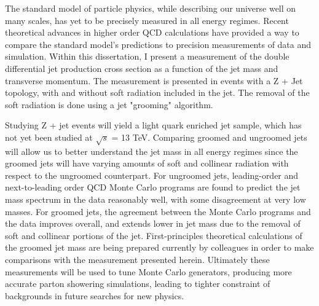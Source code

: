 
The standard model of particle physics, while describing our universe well on many scales, has yet to be precisely measured in all energy regimes. Recent theoretical advances in higher order QCD calculations have provided a way to compare the standard model's predictions to precision measurements of data and simulation. Within this dissertation, I present a measurement of the double differential jet production cross section as a function of the jet mass and transverse momentum. The measurement is presented in events with a Z + Jet topology, with and without soft radiation included in the jet. The removal of the soft radiation is done using a jet "grooming" algorithm.

Studying Z + jet events will yield a light quark enriched jet sample, which has not yet been studied at $\sqrt{s}$ = 13 TeV. Comparing groomed and ungroomed jets will allow us to better understand the jet mass in all energy regimes since the groomed jets will have varying amounts of soft and collinear radiation with respect to the ungroomed counterpart. For ungroomed jets, leading-order and next-to-leading order QCD Monte Carlo programs are found to predict the jet mass spectrum in the data reasonably well, with some disagreement at very low masses. For groomed jets, the agreement between the Monte Carlo programs and the data improves overall, and extends lower in jet mass due to the removal of soft and collinear portions of the jet. First-principles theoretical calculations of the groomed jet mass are being prepared currently by colleagues in order to make comparisons with the measurement presented herein. Ultimately these measurements will be used to tune Monte Carlo generators, producing more accurate parton showering simulations, leading to tighter constraint of backgrounds in future searches for new physics.
